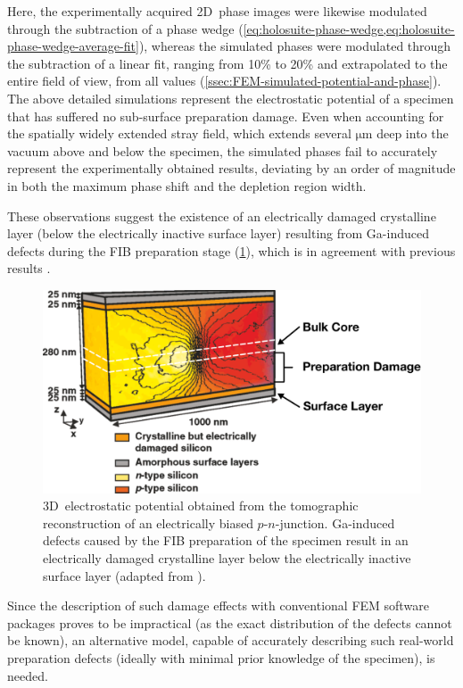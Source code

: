 Here, the experimentally acquired 2D~phase images were likewise modulated through the subtraction of a phase wedge (\cref{eq:holosuite-phase-wedge,eq:holosuite-phase-wedge-average-fit}), whereas the simulated phases were modulated through the subtraction of a linear fit, ranging from 10\% to 20\% and extrapolated to the entire field of view, from all values (\cref{ssec:FEM-simulated-potential-and-phase}).
\newpage
The above detailed simulations represent the electrostatic potential of a specimen that has suffered no sub-surface preparation damage. Even when accounting for the spatially widely extended stray field, which extends several $\si{\um}$ deep into the vacuum above and below the specimen, the simulated phases fail to accurately represent the experimentally obtained results, deviating by an order of magnitude in both the maximum phase shift and the depletion region width.

These observations suggest the existence of an electrically damaged crystalline layer (below the electrically inactive surface layer) resulting from Ga-induced defects during the FIB preparation stage (\cref{fig:FIB-preparation-damage-layer}), which is in agreement with previous results \cite{Twitchett2002,Beleggia2003,Cooper2006,Cooper2007,Twitchett-Harrison2007,Cooper2009,Somodi2013,Yazdi2015}.
\begin{figure}[H]
	\centering
	\includegraphics[width=\textwidth]{Figures/Schematics/FIB-preparation-damage-layer.pdf}
	\caption{3D~electrostatic potential obtained from the tomographic reconstruction of an electrically biased $p$-$n$-junction. Ga-induced defects caused by the FIB preparation of the specimen result in an electrically damaged crystalline layer below the electrically inactive surface layer (adapted from \cite{Twitchett-Harrison2007}).}
	\label{fig:FIB-preparation-damage-layer}
\end{figure}
Since the description of such damage effects with conventional FEM software packages proves to be impractical (as the exact distribution of the defects cannot be known), an alternative model, capable of accurately describing such real-world preparation defects (ideally with minimal prior knowledge of the specimen), is needed.
